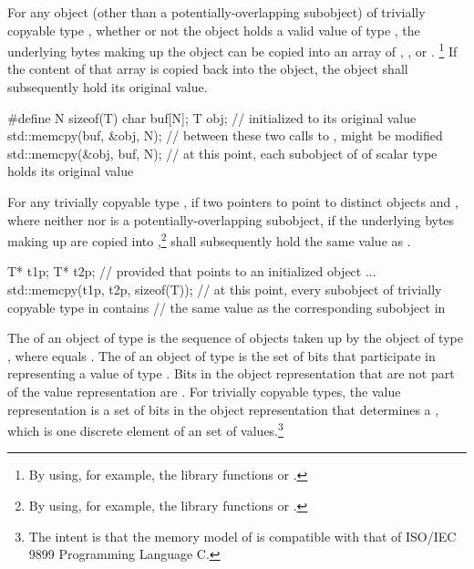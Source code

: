 \pnum
{}%
%
For any object (other than a potentially-overlapping subobject) of trivially copyable type
, whether or not the object holds a valid value of type
, the underlying bytes making up the
object can be copied into an array of
,
, or
.%
\footnote{By using, for example, the library
functions  or .}
If the content of that array
is copied back into the object, the object shall
subsequently hold its original value. \begin{example}
\begin{codeblock}
#define N sizeof(T)
char buf[N];
T obj;                          //  initialized to its original value
std::memcpy(buf, &obj, N);      // between these two calls to ,  might be modified
std::memcpy(&obj, buf, N);      // at this point, each subobject of  of scalar type holds its original value
\end{codeblock}
\end{example}

\pnum
For any trivially copyable type , if two pointers to  point to
distinct  objects  and , where neither
 nor  is a potentially-overlapping subobject, if the underlying
bytes making up
 are copied into ,\footnote{By using, for example,
the library functions  or .}
  shall subsequently hold the same value as
. \begin{example}

\begin{codeblock}
T* t1p;
T* t2p;
    // provided that  points to an initialized object ...
std::memcpy(t1p, t2p, sizeof(T));
    // at this point, every subobject of trivially copyable type in  contains
    // the same value as the corresponding subobject in 
\end{codeblock}
\end{example}%

\pnum
The 
of an object of type  is the
sequence of   objects taken up
by the object of type , where  equals
.
The 
of an object of type  is the set of bits
that participate in representing a value of type .
Bits in the object representation that are not part of the value representation
are .
For trivially copyable types, the value representation is
a set of bits in the object representation that determines a
, which is one discrete element of an
 set of values.\footnote{The
intent is that the memory model of \Cpp{} is compatible
with that of ISO/IEC 9899 Programming Language C.}

